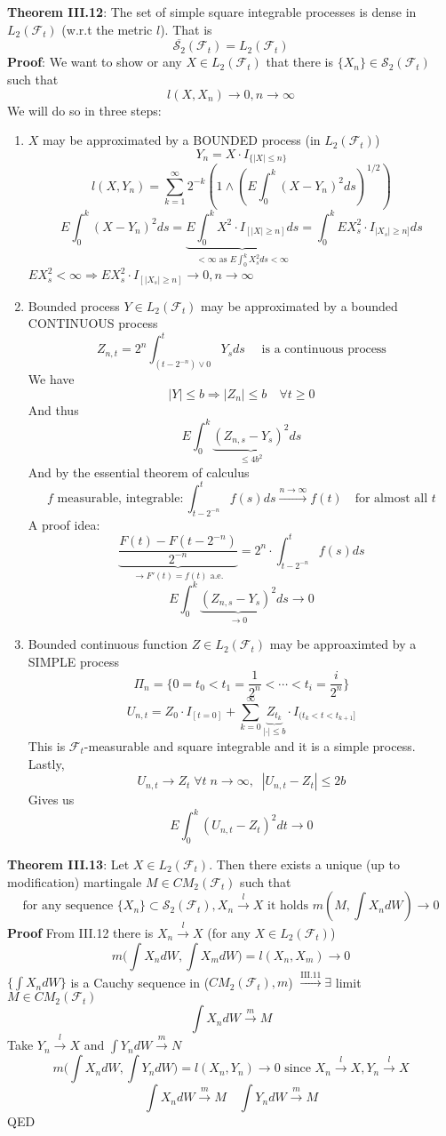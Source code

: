 \documentclass[english]{article}
\newcommand{\ub}{\underbrace}
\newcommand{\note}[1]{\noindent\textbf{#1}}
\newcommand{\F}{\mathcal F}
\begin{document}
\note{Theorem III.12}: The set of simple square integrable processes is dense in $L_2(\F_t)$ (w.r.t the metric $l$). That is 
$$\overline{\mathcal S_2}(\F_t) = L_2(\F_t)$$
\note{Proof}: We want to show or any $X\in L_2(\F_t)$ that there is $\{X_n\} \in \mathcal S_2(\F_t)$ such that
$$l(X,X_n) \to 0, n \to \infty$$
We will do so in three steps: \begin{enumerate}
\item $X$ may be approximated by a BOUNDED process (in $L_2(\F_t)$)
$$Y_n = X\cdot I_{\{|X| \leq n \}}$$
$$l(X,Y_n) = \sum^\infty_{k=1} 2^{-k} (1 \wedge (E \int^k_0 (X-Y_n)^2 ds )^{1/2} )$$
$$E\int^k_0 (X-Y_n)^2 ds = \ub{E\int^k_0 X^2 \cdot I_{[|X|\geq n]} ds}_{<\infty \text{ as } E\int^k_0 X^2_s ds < \infty}=\int^k_0 EX^2_s \cdot I_{|X_s| \geq n ]} ds$$
$EX^2_s < \infty \Rightarrow EX^2_s \cdot I_{[|X_s| \geq n ]} \to 0, n\to \infty$

\item Bounded process $Y\in L_2(\F_t)$ may be approximated by a bounded CONTINUOUS process
$$Z_{n,t} = 2^n \int^t_{(t-2^{-n})\vee 0} Y_s ds \quad\text{ is a continuous process}$$
We have
$$|Y| \leq b \Rightarrow |Z_n| \leq b \quad \forall t\geq 0$$
And thus
$$E\int^k_0 \ub{(Z_{n,s} - Y_s)^2}_{\leq 4b^2} ds$$
And by the essential theorem of calculus
$$f\text { measurable, integrable}: \int^t_{t-2^{-n}} f(s) ds \stackrel{n\to \infty}\to f(t) \quad \text{for almost all }t$$
A proof idea:
$$\ub{\frac{F(t) - F(t- 2^{-n})}{2^{-n}}}_{\to F'(t) = f(t) \text{ a.e.}} = 2^n \cdot \int^t_{t-2^{-n}} f(s) ds$$
$$E\int^k_0 \ub{(Z_{n,s}-Y_s)^2}_{\to 0} ds \to 0$$

\item Bounded continuous function $Z \in L_2(\F_t)$ may be approaximted by a SIMPLE process
$$\Pi_n = \{0=t_0 < t_1 = \frac 1{2^n} <\cdots < t_i = \frac i{2^n}\}$$
$$U_{n,t} = Z_0 \cdot I_{[t=0]} + \sum^\infty_{k=0} \ub{Z_{t_k}}_{|\cdot| \leq b} \cdot I_{( t_k < t < t_{k+1}]}$$
This is $\F_t$-measurable and square integrable and it is a simple process. Lastly,
$$U_{n,t} \to Z_t \; \forall t \; n \to \infty,\;\; |U_{n,t} - Z_t| \leq 2b$$
Gives us 
$$E \int^k_0 (U_{n,t} - Z_t)^2 dt \to 0$$
\end{enumerate}

\note{Theorem III.13}: Let $X \in L_2 (\F_t)$. Then there exists a unique (up to modification) martingale $M\in CM_2(\F_t)$ such that 
$$\text{for any sequence }\{X_n\} \subset \mathcal S_2(\F_t), X_n\stackrel{l}\to X \text{ it holds } m(M, \int X_n dW) \to 0$$
\note{Proof} From III.12 there is $X_n \stackrel l\to X$ (for any $X\in L_2(\F_t)$)
$$m\Big( \int X_n dW, \int X_m dW \Big) = l (X_n, X_m) \to 0$$
$\{ \int X_n dW \}$ is a Cauchy sequence in ($CM_2(\F_t), m$) $\stackrel{\text{III.11}}\to \exists$ limit $M\in CM_2(\F_t)$
$$\int X_n dW \stackrel{m}\to M$$
Take $Y_n \stackrel{l}\to X$ and $\int Y_n dW \stackrel{m}\to N$
$$m\Big(\int X_n dW, \int Y_n dW \Big) = l(X_n, Y_n) \to 0 \text{ since } X_n \stackrel l\to X, Y_n \stackrel l\to X$$
$$\int X_n dW \stackrel m\to M \quad \int Y_n dW \stackrel m\to M$$ 
QED \newline
\end{document}
